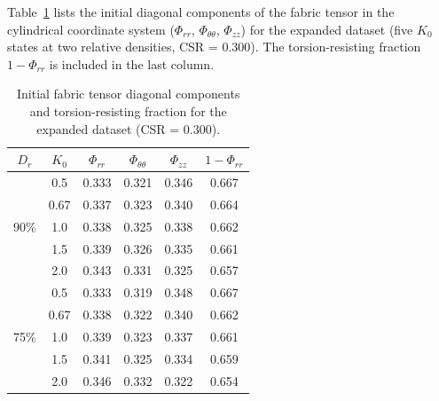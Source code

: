\documentclass[a4paper,fleqn]{cas-sc}
\newcommand{\Kzero}{\ensuremath{K_0}}
\begin{document}
Table~\ref{tab:fabric_diagonal} lists the initial diagonal components of the fabric tensor in the cylindrical coordinate system ($\Phi_{rr}$, $\Phi_{\theta\theta}$, $\Phi_{zz}$) for the expanded dataset (five \Kzero{} states at two relative densities, CSR = 0.300). The torsion-resisting fraction $1 - \Phi_{rr}$ is included in the last column.

\begin{table}[h]
\centering
\caption{Initial fabric tensor diagonal components and torsion-resisting fraction for the expanded dataset (CSR = 0.300).}
\label{tab:fabric_diagonal}
\small
\begin{tabular}{cccccc}
\toprule
$D_r$ & \Kzero{} & $\Phi_{rr}$ & $\Phi_{\theta\theta}$ & $\Phi_{zz}$ & $1-\Phi_{rr}$ \\
\midrule
\multirow{5}{*}{90\%}
& 0.5  & 0.333 & 0.321 & 0.346 & 0.667 \\
& 0.67 & 0.337 & 0.323 & 0.340 & 0.664 \\
& 1.0  & 0.338 & 0.325 & 0.338 & 0.662 \\
& 1.5  & 0.339 & 0.326 & 0.335 & 0.661 \\
& 2.0  & 0.343 & 0.331 & 0.325 & 0.657 \\
\midrule
\multirow{5}{*}{75\%}
& 0.5  & 0.333 & 0.319 & 0.348 & 0.667 \\
& 0.67 & 0.338 & 0.322 & 0.340 & 0.662 \\
& 1.0  & 0.339 & 0.323 & 0.337 & 0.661 \\
& 1.5  & 0.341 & 0.325 & 0.334 & 0.659 \\
& 2.0  & 0.346 & 0.332 & 0.322 & 0.654 \\
\bottomrule
\end{tabular}
\end{table}
 


\end{document}
